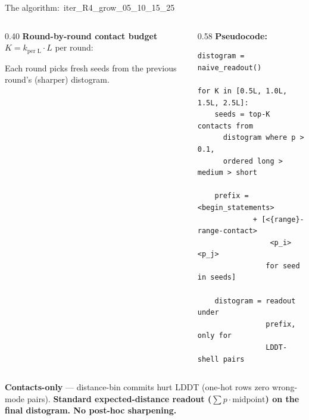 \documentclass[aspectratio=169,11pt]{beamer}
\begin{document}
\begin{frame}[fragile]{The algorithm:\ \ttfamily iter\_R4\_grow\_05\_10\_15\_25}
  \begin{columns}[T]
    \begin{column}{0.40\textwidth}
      \footnotesize\textbf{Round-by-round contact budget}\\
      $K = k_\text{per L} \cdot L$ per round:
      \vspace{0.4em}
      \begin{center}
      \end{center}
      \vspace{0.4em}
      {\footnotesize Each round picks fresh seeds from the previous round's
        (sharper) distogram.}
    \end{column}

    \begin{column}{0.58\textwidth}
      \footnotesize\textbf{Pseudocode:}
      \begin{lstlisting}[style=code,basicstyle=\ttfamily\scriptsize\color{navy}]
distogram = naive_readout()

for K in [0.5L, 1.0L, 1.5L, 2.5L]:
    seeds = top-K contacts from
      distogram where p > 0.1,
      ordered long > medium > short

    prefix = <begin_statements>
             + [<{range}-range-contact>
                 <p_i> <p_j>
                for seed in seeds]

    distogram = readout under
                prefix, only for
                LDDT-shell pairs
      \end{lstlisting}
    \end{column}
  \end{columns}
  \vspace{0.5em}
  {\footnotesize
   \textbf{Contacts-only} --- distance-bin commits hurt LDDT (one-hot rows
   zero wrong-mode pairs).\quad
   {\color{green}\bfseries Standard expected-distance readout
   ($\sum p \cdot \text{midpoint}$) on the final distogram. No post-hoc
   sharpening.}}
\end{frame}
\end{document}
